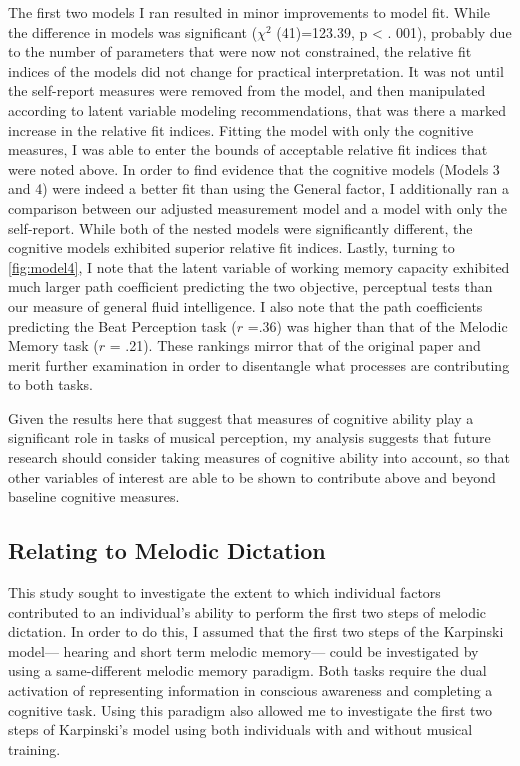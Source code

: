 \documentclass[12pt,]{book}
\begin{document}
The first two models I ran resulted in minor improvements to model fit.
While the difference in models was significant (\(\chi^2\) (41)=123.39, p \textless{} . 001), probably due to the number of parameters that were now not constrained, the relative fit indices of the models did not change for practical interpretation.
It was not until the self-report measures were removed from the model, and then manipulated according to latent variable modeling recommendations, that was there a marked increase in the relative fit indices.
Fitting the model with only the cognitive measures, I was able to enter the bounds of acceptable relative fit indices that were noted above.
In order to find evidence that the cognitive models (Models 3 and 4) were indeed a better fit than using the General factor, I additionally ran a comparison between our adjusted measurement model and a model with only the self-report.
While both of the nested models were significantly different, the cognitive models exhibited superior relative fit indices.
Lastly, turning to \ref{fig:model4}, I note that the latent variable of working memory capacity exhibited much larger path coefficient predicting the two objective, perceptual tests than our measure of general fluid intelligence.
I also note that the path coefficients predicting the Beat Perception task (\(r\) =.36) was higher than that of the Melodic Memory task (\(r\) = .21).
These rankings mirror that of the original \citep{mullensiefenMusicalityNonMusiciansIndex2014} paper and merit further examination in order to disentangle what processes are contributing to both tasks.

Given the results here that suggest that measures of cognitive ability play a significant role in tasks of musical perception, my analysis suggests that future research should consider taking measures of cognitive ability into account, so that other variables of interest are able to be shown to contribute above and beyond baseline cognitive measures.

\hypertarget{relating-to-melodic-dictation}{%
\subsection{Relating to Melodic Dictation}\label{relating-to-melodic-dictation}}

This study sought to investigate the extent to which individual factors contributed to an individual's ability to perform the first two steps of melodic dictation.
In order to do this, I assumed that the first two steps of the Karpinski model--- hearing and short term melodic memory--- could be investigated by using a same-different melodic memory paradigm.
Both tasks require the dual activation of representing information in conscious awareness and completing a cognitive task.
Using this paradigm also allowed me to investigate the first two steps of Karpinski's model using both individuals with and without musical training.
\end{document}
